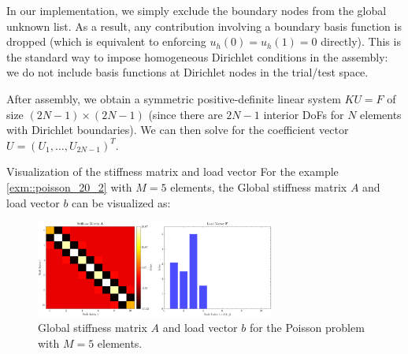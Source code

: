 \documentclass[a4paper,10pt]{article}
\begin{document}
In our implementation, we simply exclude the boundary nodes from the global unknown list. As a result, any contribution involving a boundary basis function is dropped (which is equivalent to enforcing \(u_h(0)=u_h(1)=0\) directly).
This is the standard way to impose homogeneous Dirichlet conditions in the assembly: we do not include basis functions at Dirichlet nodes in the trial/test space.

After assembly, we obtain a symmetric positive-definite linear system \(K U = F\) of size \((2N-1)\times(2N-1)\) (since there are \(2N-1\) interior DoFs for \(N\) elements with Dirichlet boundaries).
We can then solve for the coefficient vector \(U = (U_1,\dots,U_{2N-1})^T\).

\begin{remark}{Visualization of the stiffness matrix and load vector}{}
	For the example \ref{exm::poisson_20_2} with \(M=5\) elements, the Global stiffness matrix \(A\) and load vector \(b\) can be visualized as:
	\begin{figure}[H]
		\centering
		\includegraphics[width=0.7\textwidth]{figures/stiffness_matrix_and_load_vector_5_test.png}
		\caption{Global stiffness matrix \(A\) and load vector \(b\) for the Poisson problem with \(M=5\) elements.}
	\end{figure}
\end{remark}
\end{document}
